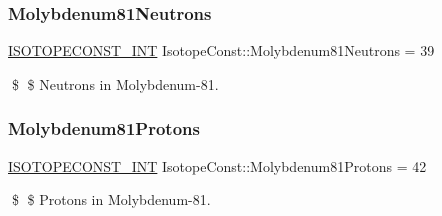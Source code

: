 \subsubsection{\texorpdfstring{Molybdenum81\+Neutrons}{Molybdenum81Neutrons}}
{\footnotesize\ttfamily \mbox{\hyperlink{group___isotope_const-_macros_ga5f18360b3e99483a35c32d789e62621c}{I\+S\+O\+T\+O\+P\+E\+C\+O\+N\+S\+T\+\_\+\+I\+NT}} Isotope\+Const\+::\+Molybdenum81\+Neutrons = 39}

\$ \$ Neutrons in Molybdenum-\/81. \mbox{\label{group___isotope_const-_molybdenum-_mo81_ga1d706de18836b0d11ef7da66b9c733bb}} 
\subsubsection{\texorpdfstring{Molybdenum81\+Protons}{Molybdenum81Protons}}
{\footnotesize\ttfamily \mbox{\hyperlink{group___isotope_const-_macros_ga5f18360b3e99483a35c32d789e62621c}{I\+S\+O\+T\+O\+P\+E\+C\+O\+N\+S\+T\+\_\+\+I\+NT}} Isotope\+Const\+::\+Molybdenum81\+Protons = 42}

\$ \$ Protons in Molybdenum-\/81. 